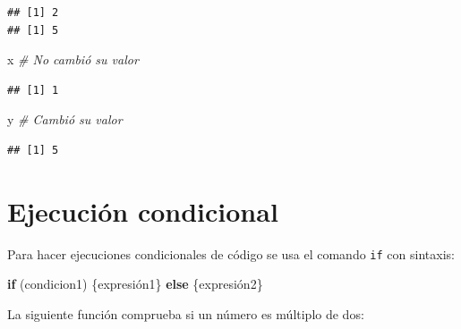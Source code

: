 \documentclass[]{book}
\newenvironment{Shaded}{\begin{snugshade}}{\end{snugshade}}
\newcommand{\KeywordTok}[1]{\textcolor[rgb]{0.13,0.29,0.53}{\textbf{#1}}}
\newcommand{\DecValTok}[1]{\textcolor[rgb]{0.00,0.00,0.81}{#1}}
\newcommand{\StringTok}[1]{\textcolor[rgb]{0.31,0.60,0.02}{#1}}
\newcommand{\CommentTok}[1]{\textcolor[rgb]{0.56,0.35,0.01}{\textit{#1}}}
\newcommand{\ControlFlowTok}[1]{\textcolor[rgb]{0.13,0.29,0.53}{\textbf{#1}}}
\newcommand{\OperatorTok}[1]{\textcolor[rgb]{0.81,0.36,0.00}{\textbf{#1}}}
\newcommand{\NormalTok}[1]{#1}
\begin{document}
\begin{verbatim}
## [1] 2
## [1] 5
\end{verbatim}

\begin{Shaded}
\begin{Highlighting}[]
\NormalTok{x }\CommentTok{# No cambió su valor}
\end{Highlighting}
\end{Shaded}

\begin{verbatim}
## [1] 1
\end{verbatim}

\begin{Shaded}
\begin{Highlighting}[]
\NormalTok{y }\CommentTok{# Cambió su valor}
\end{Highlighting}
\end{Shaded}

\begin{verbatim}
## [1] 5
\end{verbatim}

\section{Ejecución condicional}\label{ejecucion-condicional}

Para hacer ejecuciones condicionales de código se usa el comando
\texttt{if} con sintaxis:

\begin{Shaded}
\begin{Highlighting}[]
\ControlFlowTok{if}\NormalTok{ (condicion1) \{expresión1\} }\ControlFlowTok{else}\NormalTok{ \{expresión2\}}
\end{Highlighting}
\end{Shaded}

La siguiente función comprueba si un número es múltiplo de dos:

\begin{Shaded}
\end{Shaded}
\end{document}

